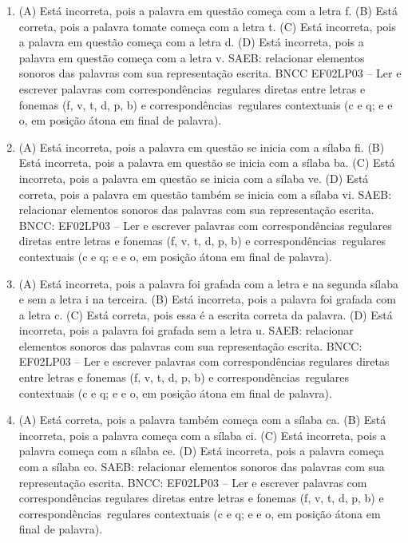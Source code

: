 \begin{enumerate}
\item
(A) Está incorreta, pois a palavra em questão começa com a letra f.
(B) Está correta, pois a palavra tomate começa com a letra t.
(C) Está incorreta, pois a palavra em questão começa com a letra d.
(D) Está incorreta, pois a palavra em questão começa com a letra v.
SAEB: relacionar elementos sonoros das palavras com sua representação escrita.
BNCC EF02LP03 -- Ler e escrever palavras com correspondências~regulares
diretas entre letras e fonemas (f, v, t, d, p, b) e correspondências~regulares contextuais (c e q; e e o, em posição átona em final de palavra).

\item
(A) Está incorreta, pois a palavra em questão se inicia com a sílaba fi.
(B) Está incorreta, pois a palavra em questão se inicia com a sílaba ba.
(C) Está incorreta, pois a palavra em questão se inicia com a sílaba ve.
(D) Está correta, pois a palavra em questão também se inicia com a sílaba vi.
SAEB: relacionar elementos sonoros das palavras com sua representação escrita.
BNCC: EF02LP03 -- Ler e escrever palavras com correspondências
regulares diretas entre letras e fonemas (f, v, t, d, p, b) e
correspondências~regulares contextuais (c e q; e e o, em posição átona
em final de palavra).

\item
(A) Está incorreta, pois a palavra foi grafada com a letra e na segunda sílaba e sem a letra i na terceira.
(B) Está incorreta, pois a palavra foi grafada com a letra c.
(C) Está correta, pois essa é a escrita correta da palavra.
(D) Está incorreta, pois a palavra foi grafada sem a letra u.
SAEB: relacionar elementos sonoros das palavras com sua representação escrita.
BNCC: EF02LP03 -- Ler e escrever palavras com correspondências
regulares diretas entre letras e fonemas (f, v, t, d, p, b) e
correspondências~regulares contextuais (c e q; e e o, em posição átona
em final de palavra).

\item
(A) Está correta, pois a palavra também começa com a sílaba ca.
(B) Está incorreta, pois a palavra começa com a sílaba ci.
(C) Está incorreta, pois a palavra começa com a sílaba ce.
(D) Está incorreta, pois a palavra começa com a sílaba co.
SAEB: relacionar elementos sonoros das palavras com sua representação escrita.
BNCC: EF02LP03 -- Ler e escrever palavras com correspondências
regulares diretas entre letras e fonemas (f, v, t, d, p, b) e
correspondências~regulares contextuais (c e q; e e o, em posição átona
em final de palavra).


\end{enumerate}
